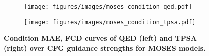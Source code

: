 \begin{figure}[h!]
    \centering
    \setlength{\abovecaptionskip}{0pt}  
    \setlength{\belowcaptionskip}{0pt}  
    
    \begin{subfigure}[b]{0.49\textwidth}  
        \centering
        \texttt{[image: figures/images/moses\_condition\_qed.pdf]}
        \label{fig:moses_condition_qed}
    \end{subfigure}
    \hfill 
    \begin{subfigure}[b]{0.49\textwidth}  
        \centering
        \texttt{[image: figures/images/moses\_condition\_tpsa.pdf]}
        \label{fig:moses_condition_tpsa}
    \end{subfigure}
    
    \caption{\textbf{Condition MAE, FCD curves of QED (left) and TPSA (right) over CFG guidance strengths for MOSES models.}}
    \label{fig:moses_condition_2}
\end{figure}